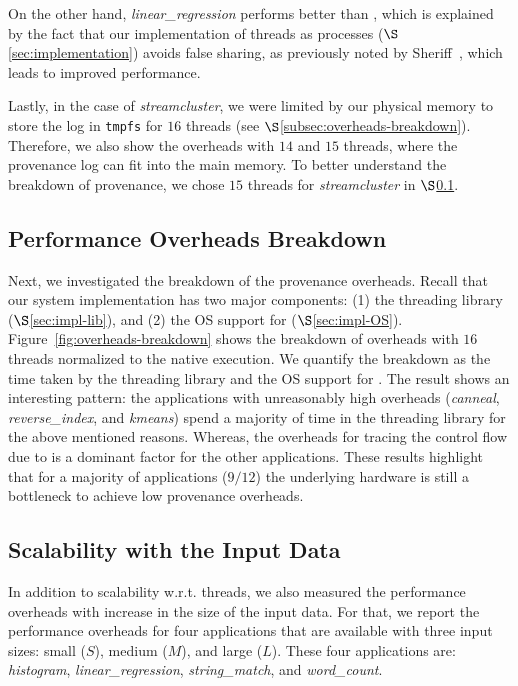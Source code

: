 On the other hand, {\em linear\_regression} performs better than \pthreads, which is explained by the fact that our implementation of threads as processes ($\S$\ref{sec:implementation})  avoids false sharing, as previously noted by Sheriff~\cite{false-sharing-sheriff}, which leads to improved performance. 



Lastly, in the case of {\em streamcluster}, we were limited by our physical memory to store the log in {\tt tmpfs} for $16$ threads (see $\S$\ref{subsec:overheads-breakdown}). Therefore, we also show the overheads with $14$ and $15$ threads,  where the provenance log can fit into the main memory.  To better understand the breakdown of provenance, we chose $15$ threads for {\em streamcluster} in $\S$\ref{subsec:performance-overheads-breakdown}.




\subsection{Performance Overheads Breakdown} 
\label{subsec:performance-overheads-breakdown}

Next, we investigated the breakdown of the provenance overheads. Recall that our system implementation has two major components: (1) the threading library ($\S$\ref{sec:impl-lib}), and (2) the OS support for \intelpt ($\S$\ref{sec:impl-OS}). 
Figure~\ref{fig:overheads-breakdown} shows the breakdown of overheads with $16$ threads normalized to the native \pthreads execution. We quantify the breakdown as the time taken by the threading library  and the OS support for \intelpt  . The result shows an interesting pattern: the applications with unreasonably high overheads ({\em canneal}, {\em reverse\_index}, and {\em kmeans}) spend a majority of time in the threading library for the above mentioned reasons. Whereas, the overheads for tracing the control flow due to \intelpt  is a dominant factor for the other applications. These results highlight that for a majority of applications ($9/12$) the underlying hardware is still a bottleneck to achieve low provenance overheads.  


\subsection{Scalability with the Input Data}
\label{subsec:data-sizes-overheads}


 In addition to scalability w.r.t.  threads, we also measured the performance overheads with increase in the size of the input data.  For that, we
report the performance overheads for four applications that are available with
three input sizes: small ($S$), medium ($M$), and large ($L$). These four applications are: {\em histogram}, {\em linear\_regression}, {\em string\_match}, and {\em word\_count}.

